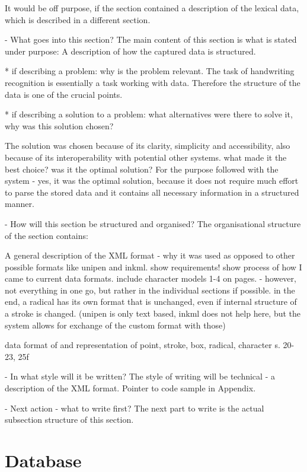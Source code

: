   It would be off purpose, if the section contained a description of the 
  lexical data, which is described in a different section.

- What goes into this section?
  The main content of this section is what is stated under purpose:
  A description of how the captured data is structured.

  * if describing a problem: why is the problem relevant.
    The task of handwriting recognition is essentially a task working with data.
    Therefore the structure of the data is one of the crucial points.
    
  * if describing a solution to a problem: what alternatives were
    there to solve it, why was this solution chosen? 

    The solution was chosen because of its clarity, simplicity and 
    accessibility, also because of its interoperability with potential 
    other systems.
    what made it the best choice? was it the optimal solution?
    For the purpose followed with the system - yes, it was the optimal solution,
    because it does not require much effort to parse the stored data
    and it contains all necessary information in a structured manner.
    
- How will this section be structured and organised?
  The organisational structure of the section contains:

  A general description of the XML format - why it was used as opposed to
  other possible formats like unipen and inkml.
  show requirements!
  show process of how I came to current data formats.
  include character models 1-4 on pages. - however, not everything in one go,
  but rather in the individual sections if possible.
  in the end, a radical has its own format that is unchanged, even
  if internal structure of a stroke is changed.
  (unipen is only text based, inkml does not help here, but the system allows
  for exchange of the custom format with those)

  data format of and representation of 
  point, stroke, box, radical, character s. 20-23, 25f

- In what style will it be written?
  The style of writing will be technical - a description of the XML format.
  Pointer to code sample in Appendix.

- Next action - what to write first?
  The next part to write is the actual subsection structure of this section.

\section{Database}
\label{sec:hwre:database}

